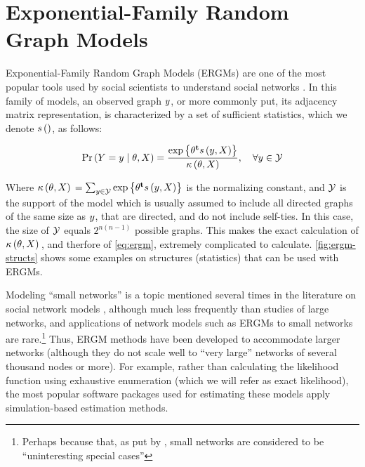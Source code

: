 \documentclass[12pt]{article}
\begin{document}
\section{Exponential-Family Random Graph Models}

Exponential-Family Random Graph Models (ERGMs) are one of the most popular tools used by social scientists to understand social networks  \cite[and others]{Robins2007,Holland1981,Wasserman1996,Snijders2006}. In this family of models, an observed graph $y$, or more commonly put, its adjacency matrix representation, is characterized by a set of sufficient statistics, which we denote $s\left(\right)$, as follows:

\begin{equation}
\label{eq:ergm}
  \Prcond{\Adjmat = \adjmat}{\params, \Indepvar} = \frac{%
  	\exp{\transpose{\params}\sufstats{\adjmat, \Indepvar}}%
  }{
  	\kappa\left(\params, \Indepvar\right)
  },\quad\forall \adjmat\in\ADJMAT
\end{equation}

\noindent Where $\kappa\left(\theta, X\right){} = \sum_{y\in\mathcal{Y}}\mbox{exp}\left\{{\theta}^\mathbf{t}s\left(y, X\right)\right\}$ is the normalizing constant, and $\mathcal{Y}$ is the support of the model which is usually assumed to include all directed graphs of the same size as $y$, that are directed, and do not include self-ties. In this case, the size of $\mathcal{Y}$ equals $2^{n(n-1)}$ possible graphs. This makes the exact calculation of $\kappa\left(\theta, X\right){}$, and therfore of \eqref{eq:ergm}, extremely complicated to calculate. \autoref{fig:ergm-structs} shows some examples on structures (statistics) that can be used with ERGMs.

Modeling ``small networks'' is a topic mentioned several times in the literature on social network models  \cite{Wasserman1996,Frank1986,Snijders2011},  although much less frequently than studies of large networks, and applications of network models such as ERGMs to small networks are rare.\footnote{Perhaps because that, as put by \cite{Snijders2011}, small networks are considered to be ``uninteresting special cases''} Thus, ERGM methods have been developed to accommodate larger networks (although they do not scale well to ``very large'' networks of several thousand nodes or more). For example, rather than calculating the likelihood function using exhaustive enumeration (which we will refer as exact likelihood), the most popular software packages used for estimating these models apply simulation-based estimation methods.
\end{document}
